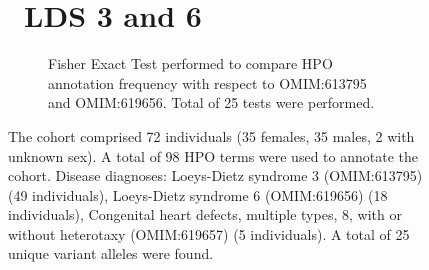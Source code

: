 \begin{figure}[htbp]
\section*{ LDS 3 and 6}
\centering
\begin{subfigure}[b]{0.95\textwidth}
\centering
{}
\captionsetup{justification=raggedright,singlelinecheck=false}
\caption{
Fisher Exact Test performed to compare HPO annotation frequency with respect to OMIM:613795 and OMIM:619656. Total of
25 tests were performed.
}
\end{subfigure}
\vspace{2em}
\caption{ The cohort comprised 72 individuals (35 females, 35 males, 2 with unknown sex). A total of 98 HPO terms were used to annotate the cohort. Disease diagnoses: Loeys-Dietz syndrome 3 (OMIM:613795) (49 individuals), Loeys-Dietz syndrome 6 (OMIM:619656) (18 individuals), Congenital heart defects, multiple types, 8, with or without heterotaxy (OMIM:619657) (5 individuals). A total of 25 unique variant alleles were found.}
\end{figure}

